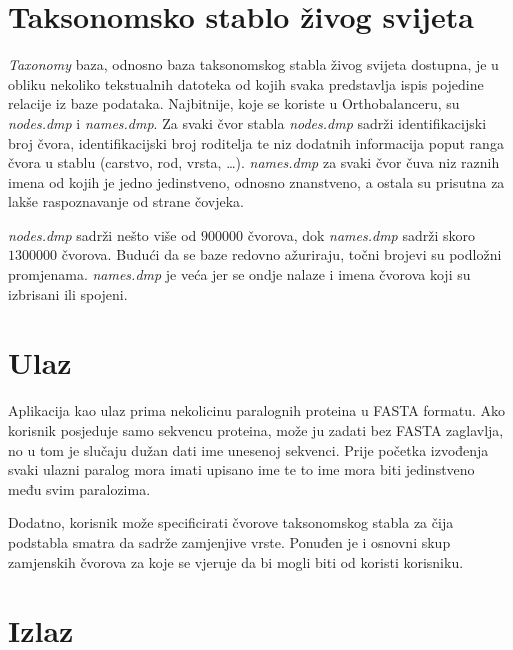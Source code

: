 \section{Taksonomsko stablo živog svijeta}
\label{sec:taxdb}

\emph{Taxonomy} baza, odnosno baza taksonomskog stabla živog svijeta
dostupna, je u obliku nekoliko tekstualnih datoteka od kojih svaka predstavlja
ispis pojedine relacije iz baze podataka. Najbitnije, koje se koriste u
Orthobalanceru, su \emph{nodes.dmp} i \emph{names.dmp}. Za svaki čvor stabla
\emph{nodes.dmp} sadrži identifikacijski broj čvora, identifikacijski broj
roditelja te niz dodatnih informacija poput ranga čvora u stablu (carstvo, rod,
vrsta, \ldots). \emph{names.dmp} za svaki čvor čuva niz raznih imena od kojih
je jedno jedinstveno, odnosno znanstveno, a ostala su prisutna za lakše
raspoznavanje od strane čovjeka.

\begin{sloppypar}

\emph{nodes.dmp} sadrži nešto više od $900000$ čvorova, dok \emph{names.dmp}
sadrži skoro $1300000$ čvorova. Budući da se baze redovno ažuriraju, točni
brojevi su podložni promjenama. \emph{names.dmp} je veća jer se ondje nalaze i
imena čvorova koji su izbrisani ili spojeni.

\end{sloppypar}


\section{Ulaz}
\label{sec:input}

Aplikacija kao ulaz prima nekolicinu paralognih proteina u FASTA formatu. Ako
korisnik posjeduje samo sekvencu proteina, može ju zadati bez FASTA zaglavlja,
no u tom je slučaju dužan dati ime unesenoj sekvenci. Prije početka izvođenja
svaki ulazni paralog mora imati upisano ime te to ime mora biti jedinstveno među
svim paralozima.

Dodatno, korisnik može specificirati čvorove taksonomskog stabla za čija
podstabla smatra da sadrže zamjenjive vrste. Ponuđen je i osnovni skup
zamjenskih čvorova za koje se vjeruje da bi mogli biti od koristi korisniku.


\section{Izlaz}
\label{sec:output}

